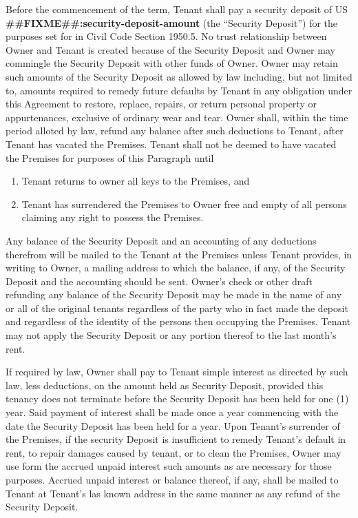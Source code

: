 \documentclass[8pt, letterpaper, oneside]{extarticle}
\newcounter{para}
\newcommand\numparagraph{\par\refstepcounter{para}\textbf{\thepara}\hspace{5mm}}
\begin{document}
 \numparagraph{\textbf{SECURITY DEPOSIT:}\hspace{2mm}} Before the commencement of the term, Tenant shall pay a security deposit of US \textbf{##FIXME##:security-deposit-amount} (the ``Security Deposit'') for the purposes set for in Civil Code Section 1950.5. No trust relationship between Owner and Tenant is created because of the Security Deposit and Owner may commingle the Security Deposit with other funds of Owner. Owner may retain such amounts of the Security Deposit as allowed by law including, but not limited to, amounts required to remedy future defaults by Tenant in any obligation under this Agreement to restore, replace, repairs, or return personal property or appurtenances, exclusive of ordinary wear and tear. Owner shall, within the time period alloted by law, refund any balance after such deductions to Tenant, after Tenant has vacated the Premises. Tenant shall not be deemed to have vacated the Premises for purposes of this Paragraph until
  \begin{enumerate}
   \item Tenant returns to owner all keys to the Premises, and
   \item Tenant has surrendered the Premises to Owner free and empty of all persons claiming any right to possess the Premises.
   \end{enumerate}
 Any balance of the Security Deposit and an accounting of any deductions therefrom will be mailed to the Tenant at the Premises unless Tenant provides, in writing to Owner, a mailing address to which the balance, if any, of the Security Deposit and the accounting should be sent. Owner's check or other draft refunding any balance of the Security Deposit may be made in the name of any or all of the original tenants regardless of the party who in fact made the deposit and regardless of the identity of the persons then occupying the Premises. Tenant may not apply the Security Deposit or any portion thereof to the last month's rent.

 If required by law, Owner shall pay to Tenant simple interest as directed by such law, less deductions, on the amount held as Security Deposit, provided this tenancy does not terminate before the Security Deposit has been held for one (1) year. Said payment of interest shall be made once a year commencing with the date the Security Deposit has been held for a year. Upon Tenant's surrender of the Premises, if the security Deposit is insufficient to remedy Tenant's default in rent, to repair damages caused by tenant, or to clean the Premises, Owner may use form the accrued unpaid interest such amounts as are necessary for those purposes. Accrued unpaid interest or balance thereof, if any, shall be mailed to Tenant at Tenant's las known address in the same manner as any refund of the Security Deposit.
\end{document}
